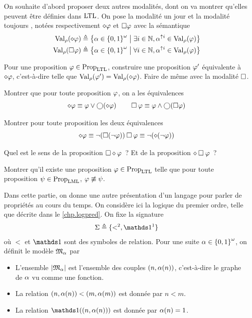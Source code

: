 \begin{problem}
  \noindent
  On souhaite d'abord proposer deux autres modalités, dont on va montrer
  qu'elles peuvent être définies dans $\operatorname{LTL}$. On pose la modalité
  \og un jour \fg et la modalité \og toujours \fg, notées respectivement
  $\mathbin{\diamond}\varphi$ et $\mathbin{\square}\varphi$ avec la sémantique
  \begin{align*}
    \operatorname{Val}_{\rho}(\mathbin{\diamond}\varphi) &\triangleq
    \left\{ \alpha\in{\{0,1\}}^{\omega} \;\middle\vert\; \exists i\in\mathbb N,\alpha^{\uparrow i}\in\operatorname{Val}_{\rho}(\varphi) \right\}
    \\
    \operatorname{Val}_{\rho}(\mathbin{\square}\varphi) &\triangleq
    \left\{ \alpha\in{\{0,1\}}^{\omega} \;\middle\vert\; \forall i\in\mathbb N,\alpha^{\uparrow i}\in\operatorname{Val}_{\rho}(\varphi) \right\}
  \end{align*}
  \begin{pbQuest}[resume]
  \item Pour une proposition $\varphi\in\operatorname{Prop}_{\operatorname{LTL}}$, construire une proposition
    $\varphi'$ équivalente à $\mathbin{\diamond}\varphi$, c'est-à-dire telle que
    $\operatorname{Val}_{\rho}(\varphi') = \operatorname{Val}_{\rho}(\mathbin{\diamond}\varphi)$. Faire de même avec la modalité
    $\mathbin{\square}$.
  \item Montrer que pour toute proposition $\varphi$, on a les équivalences
    \[\mathbin{\diamond}\varphi \equiv \varphi\lor\mathbin{\bigcirc}(\mathbin{\diamond}\varphi)\qquad
    \mathbin{\square}\varphi \equiv \varphi\land\mathbin{\bigcirc}(\mathbin{\square}\varphi)\]
  \item Montrer pour toute proposition les deux équivalences
    \[\mathbin{\diamond}\varphi \equiv \lnot(\mathbin{\square}(\lnot\varphi))
    \mathbin{\square}\varphi \equiv \lnot(\mathbin{\diamond}(\lnot\varphi))\]
  \item Quel est le sens de la proposition $\mathbin{\square}\mathbin{\diamond}\varphi$~? Et de la
    proposition $\mathbin{\diamond}\mathbin{\square}\varphi$~?
  \item Montrer qu'il existe une proposition $\varphi\in\operatorname{Prop}_{\operatorname{LTL}}$ telle que
    pour toute proposition $\psi\in\operatorname{Prop}_{\operatorname{LML}}$, $\varphi\not\equiv\psi$.
  \end{pbQuest}


  Dans cette partie, on donne une autre présentation d'un langage pour parler de
  propriétés au cours du temps. On considère ici la logique du premier ordre,
  telle que décrite dans le \cref{chp.logpred}. On fixe la signature
  \[\Sign \defeq \{<^2, \vara^1\}\]
  où $<$ et $\vara$ sont des symboles de relation. Pour une suite
  $\alpha\in{\{0,1\}}^{\omega}$, on définit le modèle $\mathfrak{M}_{\alpha}$ par
  \begin{itemize}
  \item L'ensemble $\left\vert \mathfrak{M}_{\alpha}\right\vert$ est l'ensemble des couples
    $(n,\alpha(n))$, c'est-à-dire le graphe de $\alpha$ vu comme une
    fonction.
  \item La relation $(n,\alpha(n)) < (m,\alpha(m))$ est donnée par
    $n < m$.
  \item La relation $\vara((n,\varstr(n)))$ est donnée par
    $\alpha(n) = 1$.
  \end{itemize}


\end{problem}
